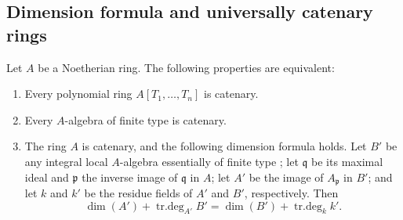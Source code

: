\subsection{Dimension formula and universally catenary rings}
\label{subsection:IV.5.6}
\label{IV.5.6}


\begin{proposition}[5.6.1]
\label{IV.5.6.1}
Let $A$ be a Noetherian ring.  The following properties are
equivalent:
\begin{enumerate}[{\rm(a)}]
\item
{}
\label{IV.5.6.1.a}
Every polynomial ring $A[T_1,\ldots,T_n]$ is catenary.

\item
{}
\label{IV.5.6.1.b}
Every $A$-algebra of finite type is catenary.

\item
{}
\label{IV.5.6.1.c}
The ring $A$ is catenary, and the following dimension formula holds.
Let $B'$ be any integral local $A$-algebra essentially of finite type
; let $\mathfrak q$ be its maximal ideal and
$\mathfrak p$ the inverse image of $\mathfrak q$ in $A$; let $A'$
be the image of $A_{\mathfrak p}$ in $B'$; and let $k$ and $k'$ be
the residue fields of $A'$ and $B'$, respectively.  Then
\begin{equation}
\dim(A')+\operatorname{tr.deg}_{A'}B'
 =\dim(B')+\operatorname{tr.deg}_k k'.
\tag{5.6.1.1}\label{IV.5.6.1.1}
\end{equation}
\end{enumerate}
\end{proposition}

